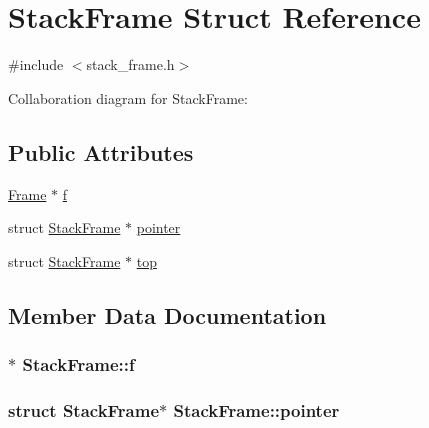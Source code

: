 \hypertarget{structStackFrame}{}\section{Stack\+Frame Struct Reference}
\label{structStackFrame}


{\ttfamily \#include $<$stack\+\_\+frame.\+h$>$}



Collaboration diagram for Stack\+Frame\+:
\subsection*{Public Attributes}
\begin{DoxyCompactItemize}
\item 
\hyperlink{structFrame}{Frame} $\ast$ \hyperlink{structStackFrame_a344a354f24d9c4b6c805cd0a029100b9}{f}
\item 
struct \hyperlink{structStackFrame}{Stack\+Frame} $\ast$ \hyperlink{structStackFrame_aae670075795a607599420fd8b5181292}{pointer}
\item 
struct \hyperlink{structStackFrame}{Stack\+Frame} $\ast$ \hyperlink{structStackFrame_a9f0df83101cacbe812d0d4b3c6e08494}{top}
\end{DoxyCompactItemize}


\subsection{Member Data Documentation}
\subsubsection[{\texorpdfstring{f}{f}}]{$\ast$ Stack\+Frame\+::f}\hypertarget{structStackFrame_a344a354f24d9c4b6c805cd0a029100b9}{}\label{structStackFrame_a344a354f24d9c4b6c805cd0a029100b9}
\subsubsection[{\texorpdfstring{pointer}{pointer}}]{\setlength{\rightskip}{0pt plus 5cm}struct {\bf Stack\+Frame}$\ast$ Stack\+Frame\+::pointer}\hypertarget{structStackFrame_aae670075795a607599420fd8b5181292}{}\label{structStackFrame_aae670075795a607599420fd8b5181292}

